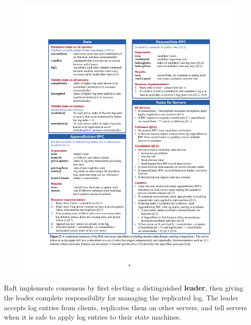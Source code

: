 \documentclass[11pt]{article}
\begin{document}
\begin{figure}[htbp]
\centering
\includegraphics[width=.9\linewidth]{../images/6.824/3.pdf}
\label{}
\end{figure}


Raft implements consensus by first electing a distinguished \textbf{leader}, then giving the leader
complete responsibility for managing the replicated log. The leader accepts log entries from
clients, replicates them on other servers, and tell servers when it is safe to apply log entries
to their state machines.
\end{document}
